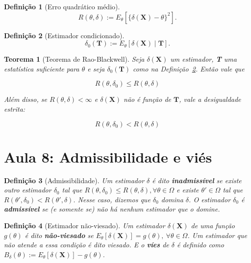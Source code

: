 \documentclass{article}
\newtheorem{theorem}{Teorema}
\newtheorem{definition}{Definição}
\begin{document}
\begin{definition}[Erro quadrático médio]
\begin{equation}
    R(\theta, \delta) := E_\theta \left [ \{ \delta(\textbf{X}) - \theta \}^2 \right ].
\end{equation}
\end{definition}

\begin{definition}[Estimador condicionado]\label{def:est. cond.}
\begin{equation}
    \delta_0 (\textbf{T}) := E_\theta \left [ \delta(\textbf{X}) \mid \textbf{T} \right ].
\end{equation}
\end{definition}

\begin{theorem}[Teorema de Rao-Blackwell]
Seja $\delta(\textbf{X})$ um estimador, \textbf{T} uma estatística suficiente para $\theta$ e seja $\delta_0(\textbf{T})$ como na Definição~\ref{def:est. cond.}. Então vale que

$$R(\theta, \delta_0) \leq R(\theta, \delta)$$

Além disso, se $R(\theta, \delta) < \infty$ e $\delta (\textbf{X})$ não é função de $\textbf{T}$, vale a desigualdade estrita:

$$R(\theta, \delta_0) < R(\theta, \delta)$$
\end{theorem}

\section*{Aula 8: Admissibilidade e viés}
\label{s8}
\begin{definition}[Admissibilidade]
Um estimador $\delta$ é dito \textbf{inadmissível} se existe outro estimador $\delta_0$ tal que $R(\theta, \delta_0) \leq R(\theta, \delta), \forall \theta \in \Omega$ e existe $\theta' \in \Omega$ tal que $R(\theta', \delta_0) < R(\theta', \delta)$. Nesse caso, dizemos que $\delta_0$ domina $\delta$. O estimador $\delta_0$ é \textbf{admissível} se (e somente se) não há nenhum estimador que o domine.
\end{definition}

\begin{definition}[Estimador não-viesado]
Um estimador $\delta(\textbf{X})$ de uma função $g(\theta)$ é dito \textbf{não-viesado} se $E_\theta[\delta(\textbf{X})] = g(\theta), \ \forall \theta \in \Omega$. Um estimador que não atende a essa condição é dito viesado. E o \textbf{víes} de $\delta$ é definido como $B_\delta(\theta) := E_\theta[\delta(\textbf{X})] - g(\theta)$.
\end{definition}
\end{document}
